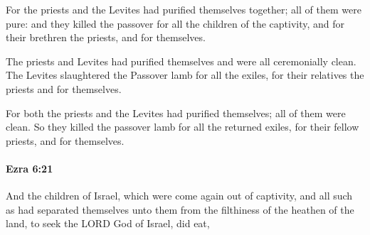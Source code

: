 			\begin{versebox}
					\item[BHS] 
					\item[LXX] 
					\item[ASV] For the priests and the Levites had purified themselves together; all of them were pure: and they killed the passover for all the children of the captivity, and for their brethren the priests, and for themselves.
					\item[NIV] The priests and Levites had purified themselves and were all ceremonially clean. The Levites slaughtered the Passover lamb for all the exiles, for their relatives the priests and for themselves.
					\item[NRSV] For both the priests and the Levites had purified themselves; all of them were clean. So they killed the passover lamb for all the returned exiles, for their fellow priests, and for themselves.
			\end{versebox}

		\paragraph{Ezra 6:21} %
			\label{EZRA-6-21}

			And the children of Israel, which were come again out of captivity, and all such as had separated themselves unto them from the filthiness of the heathen of the land, to seek the LORD God of Israel, did eat,

